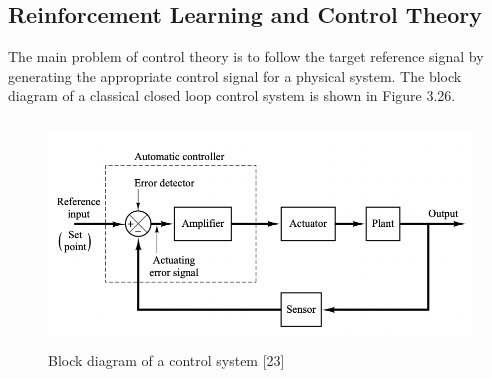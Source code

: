 \documentclass[12pt,twoside,a4]{mwbk}
\begin{document}
\subsection{Reinforcement Learning and Control Theory}
The main problem of control theory is to follow the target reference signal by generating the appropriate control signal for a physical system. The block diagram of a classical closed loop control system is shown in Figure 3.26.
\begin{figure}[h]
    \centering
    \includegraphics[width=12.4 cm, height=6.0cm]{control.png}
    \caption{Block diagram of a control system [23]}
\end{figure}
\end{document}
